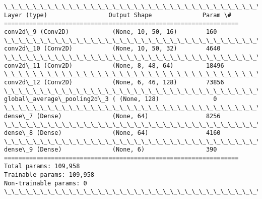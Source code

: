 \documentclass[11pt]{article}
\begin{document}
    \begin{Verbatim}[commandchars=\\\{\}]
\_\_\_\_\_\_\_\_\_\_\_\_\_\_\_\_\_\_\_\_\_\_\_\_\_\_\_\_\_\_\_\_\_\_\_\_\_\_\_\_\_\_\_\_\_\_\_\_\_\_\_\_\_\_\_\_\_\_\_\_\_\_\_\_\_
Layer (type)                 Output Shape              Param \#   
=================================================================
conv2d\_9 (Conv2D)            (None, 10, 50, 16)        160       
\_\_\_\_\_\_\_\_\_\_\_\_\_\_\_\_\_\_\_\_\_\_\_\_\_\_\_\_\_\_\_\_\_\_\_\_\_\_\_\_\_\_\_\_\_\_\_\_\_\_\_\_\_\_\_\_\_\_\_\_\_\_\_\_\_
conv2d\_10 (Conv2D)           (None, 10, 50, 32)        4640      
\_\_\_\_\_\_\_\_\_\_\_\_\_\_\_\_\_\_\_\_\_\_\_\_\_\_\_\_\_\_\_\_\_\_\_\_\_\_\_\_\_\_\_\_\_\_\_\_\_\_\_\_\_\_\_\_\_\_\_\_\_\_\_\_\_
conv2d\_11 (Conv2D)           (None, 8, 48, 64)         18496     
\_\_\_\_\_\_\_\_\_\_\_\_\_\_\_\_\_\_\_\_\_\_\_\_\_\_\_\_\_\_\_\_\_\_\_\_\_\_\_\_\_\_\_\_\_\_\_\_\_\_\_\_\_\_\_\_\_\_\_\_\_\_\_\_\_
conv2d\_12 (Conv2D)           (None, 6, 46, 128)        73856     
\_\_\_\_\_\_\_\_\_\_\_\_\_\_\_\_\_\_\_\_\_\_\_\_\_\_\_\_\_\_\_\_\_\_\_\_\_\_\_\_\_\_\_\_\_\_\_\_\_\_\_\_\_\_\_\_\_\_\_\_\_\_\_\_\_
global\_average\_pooling2d\_3 ( (None, 128)               0         
\_\_\_\_\_\_\_\_\_\_\_\_\_\_\_\_\_\_\_\_\_\_\_\_\_\_\_\_\_\_\_\_\_\_\_\_\_\_\_\_\_\_\_\_\_\_\_\_\_\_\_\_\_\_\_\_\_\_\_\_\_\_\_\_\_
dense\_7 (Dense)              (None, 64)                8256      
\_\_\_\_\_\_\_\_\_\_\_\_\_\_\_\_\_\_\_\_\_\_\_\_\_\_\_\_\_\_\_\_\_\_\_\_\_\_\_\_\_\_\_\_\_\_\_\_\_\_\_\_\_\_\_\_\_\_\_\_\_\_\_\_\_
dense\_8 (Dense)              (None, 64)                4160      
\_\_\_\_\_\_\_\_\_\_\_\_\_\_\_\_\_\_\_\_\_\_\_\_\_\_\_\_\_\_\_\_\_\_\_\_\_\_\_\_\_\_\_\_\_\_\_\_\_\_\_\_\_\_\_\_\_\_\_\_\_\_\_\_\_
dense\_9 (Dense)              (None, 6)                 390       
=================================================================
Total params: 109,958
Trainable params: 109,958
Non-trainable params: 0
\_\_\_\_\_\_\_\_\_\_\_\_\_\_\_\_\_\_\_\_\_\_\_\_\_\_\_\_\_\_\_\_\_\_\_\_\_\_\_\_\_\_\_\_\_\_\_\_\_\_\_\_\_\_\_\_\_\_\_\_\_\_\_\_\_

    \end{Verbatim}
\end{document}
